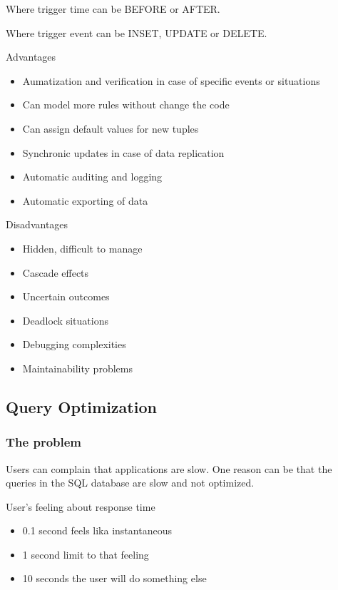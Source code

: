 Where trigger time can be BEFORE or AFTER. 

Where trigger event can be INSET, UPDATE or DELETE.

\vspace{10pt}

Advantages

\begin{itemize}
    \item Aumatization and verification in case of specific events or situations
    \item Can model more rules without change the code
    \item Can assign default values for new tuples
    \item Synchronic updates in case of data replication
    \item Automatic auditing and logging
    \item Automatic exporting of data
\end{itemize}

Disadvantages

\begin{itemize}
    \item Hidden, difficult to manage
    \item Cascade effects
    \item Uncertain outcomes 
    \item Deadlock situations
    \item Debugging complexities
    \item Maintainability problems
\end{itemize}

\subsection{Query Optimization}


\subsubsection{The problem}

Users can complain that applications are slow. One reason can be that the queries in the SQL database are slow and not optimized.

User's feeling about response time
\begin{itemize}
    \item 0.1 second \ra feels lika instantaneous
    \item 1 second \ra limit to that feeling
    \item 10 seconds \ra the user will do something else
\end{itemize}

